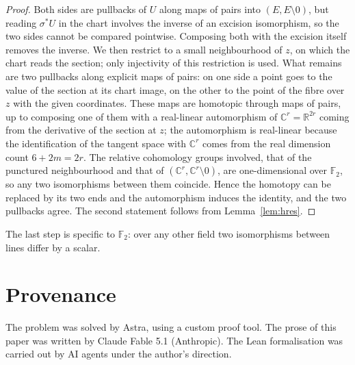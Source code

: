 \documentclass[11pt]{amsart}
\theoremstyle{plain}
\theoremstyle{definition}
\newcommand{\F}{\mathbb F}
\newcommand{\C}{\mathbb C}
\newcommand{\R}{\mathbb R}
\begin{document}
\begin{proof}
Both sides are pullbacks of $U$ along maps of pairs into
$(E, E \setminus 0)$, but reading $\sigma^{*}U$ in the chart involves the
inverse of an excision isomorphism, so the two sides cannot be compared
pointwise.  Composing both with the excision itself removes the inverse.  We
then restrict to a small neighbourhood of $z$, on which the chart reads the
section; only injectivity of this restriction is used.  What remains are two
pullbacks along explicit maps of pairs: on one side a point goes to the value
of the section at its chart image, on the other to the point of the fibre over
$z$ with the given coordinates.  These maps are homotopic through maps of
pairs, up to composing one of them with a real-linear automorphism of
$\C^{r} = \R^{2r}$ coming from the derivative of the section at $z$; the
automorphism is real-linear because the identification of the tangent space
with $\C^r$ comes from the real dimension count $6 + 2m = 2r$.  The relative
cohomology groups involved, that of the punctured neighbourhood and that of
$(\C^r, \C^r \setminus 0)$, are one-dimensional over $\F_2$, so any two
isomorphisms between them coincide.  Hence the homotopy can be replaced by
its two ends and the automorphism induces the identity, and the two pullbacks
agree.  The second statement follows from Lemma~\ref{lem:hres}.
\end{proof}

The last step is specific to $\F_2$: over any other field two isomorphisms
between lines differ by a scalar.

\section*{Provenance}

The problem was solved by Astra, using a custom proof tool.  The prose of
this paper was written by Claude Fable 5.1 (Anthropic).  The Lean
formalisation was carried out by AI agents under the author's direction.
\end{document}
